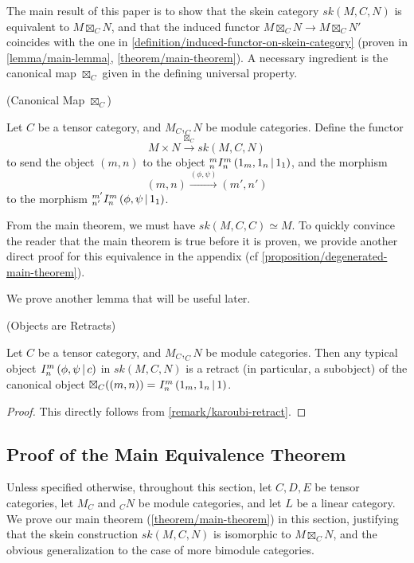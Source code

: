 \noindent The main result of this paper is to show that the skein category
$sk(M,C,N)$ is equivalent to $M \boxtimes_{C} N$, and that the induced functor $M \boxtimes_{C} N \to M \boxtimes_{C} N'$
coincides with the one in \ref{definition/induced-functor-on-skein-category}
(proven in \ref{lemma/main-lemma}, \ref{theorem/main-theorem}). A necessary
ingredient is the canonical map $\boxtimes_{C}$ given in the defining universal
property.

\begin{definition}\label{definition/canonical-map} (Canonical Map $\boxtimes_{C}$)

  \noindent Let $C$ be a tensor category, and $M_{C}, _{C}N$ be module
  categories. \quad Define the functor
  \[
    M \times N \xrightarrow{\boxtimes_{C}} sk(M,C,N)
  \]
  to send the object $(m,n)$ to the object ${}^{m}_{n} I^{m}_{n} \left( 1_{m}, 1_{n} \,\middle|\, 1_{1} \right)$, and the morphism
  \[
    (m,n) \xrightarrow{(\phi, \psi)} (m', n')
  \]
  to the morphism ${}^{m'}_{n'} I^{m}_{n} \left( \phi, \psi \,\middle|\, 1_{1} \right)$.
\end{definition}

\noindent From the main theorem, we must have $sk(M,C,C) \simeq M$. To quickly
convince the reader that the main theorem is true before it is proven, we
provide another direct proof for this equivalence in the appendix (cf
\ref{proposition/degenerated-main-theorem}).

\hfill\break
\noindent We prove another lemma that will be useful later.

\begin{lemma}\label{lemma/I-provides-subobject} (Objects are Retracts)

  \noindent Let $C$ be a tensor category, and $M_{C}, _{C}N$ be module
  categories. \quad Then any typical object ${}^{}_{} I^{m}_{n} \left( \phi, \psi \,\middle|\, c \right)$ in
  $sk(M,C,N)$ is a retract (in particular, a subobject) of the canonical
  object $\boxtimes_{C}((m,n)) = {}^{}_{} I^{m}_{n} \left( 1_{m}, 1_{n} \,\middle|\, 1 \right)$.
\end{lemma}
\begin{proof}
  This directly follows from \ref{remark/karoubi-retract}.
\end{proof}



\subsection{Proof of the Main Equivalence Theorem}\label{section/proof-of-equivalence}

Unless specified otherwise, throughout this section, let $C, D, E$ be tensor
categories, let $M_{C}$ and $_{C}N$ be module categories, and let $L$ be a
linear category. We prove our main theorem (\ref{theorem/main-theorem}) in this section, justifying
that the skein construction $sk(M,C,N)$ is isomorphic to $M \boxtimes_{C} N$, and the
obvious generalization to the case of more bimodule categories.

